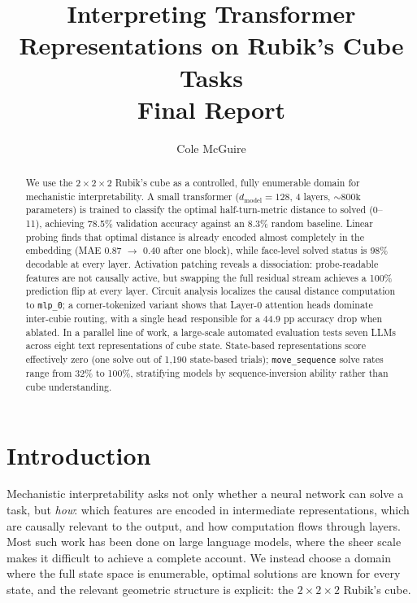 \documentclass[12pt]{article}
\title{Interpreting Transformer Representations on Rubik's Cube Tasks\\
\large Final Report}
\author{Cole McGuire}
\date{}
\begin{document}
\maketitle

\begin{abstract}
We use the $2{\times}2{\times}2$ Rubik's cube as a controlled, fully enumerable
domain for mechanistic interpretability.  A small transformer
($d_\text{model}{=}128$, 4 layers, ${\sim}800\text{k}$ parameters) is trained to
classify the optimal half-turn-metric distance to solved (0--11), achieving
78.5\% validation accuracy against an 8.3\% random baseline.  Linear probing
finds that optimal distance is already encoded almost completely in the embedding
(MAE 0.87 $\to$ 0.40 after one block), while face-level solved status is 98\%
decodable at every layer.  Activation patching reveals a dissociation:
probe-readable features are not causally active, but swapping the full residual
stream achieves a 100\% prediction flip at every layer.  Circuit analysis
localizes the causal distance computation to \texttt{mlp\_0}; a corner-tokenized
variant shows that Layer-0 attention heads dominate inter-cubie routing, with a
single head responsible for a 44.9 pp accuracy drop when ablated.  In a parallel
line of work, a large-scale automated evaluation tests seven LLMs across eight
text representations of cube state.  State-based representations score
effectively zero (one solve out of 1,190 state-based trials);
\texttt{move\_sequence} solve rates range from 32\% to 100\%, stratifying
models by sequence-inversion ability rather than cube understanding.
\end{abstract}

\section{Introduction}

Mechanistic interpretability asks not only whether a neural network can solve a
task, but \emph{how}: which features are encoded in intermediate representations,
which are causally relevant to the output, and how computation flows through
layers.  Most such work has been done on large language models, where the sheer
scale makes it difficult to achieve a complete account.  We instead choose a
domain where the full state space is enumerable, optimal solutions are known for
every state, and the relevant geometric structure is explicit: the $2{\times}2{\times}2$
Rubik's cube.
\end{document}

